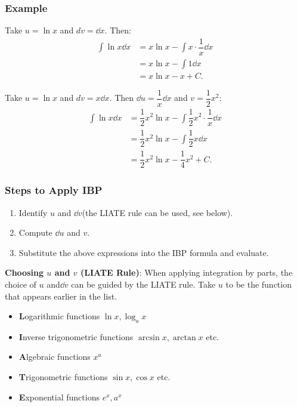 \subsubsection{Example} 
\begin{ex}
    Take $u = \ln x$ and $dv = \dd x$. Then:
    \begin{align*}
        \int \ln x \dd x &= x \ln x - \int x \cdot \dfrac{1}{x} \dd x \\
        &= x \ln x - \int 1 \dd x \\
        &= x \ln x - x + C.
    \end{align*}
\end{ex}

\begin{ex} 
    Take $u = \ln x$ and $dv = x \dd x$. Then $\dd u = \dfrac{1}{x} \dd x $ and $v = \dfrac{1}{2} x^2$:
    \begin{align*}
        \int \ln x \dd x &= \dfrac{1}{2}x^2 \ln x - \int \dfrac{1}{2}x^2 \cdot \dfrac{1}{x} \dd x \\
        &= \dfrac{1}{2}x^2 \ln x - \int \dfrac{1}{2} x \dd x \\
        &= \dfrac{1}{2}x^2 \ln x - \dfrac{1}{4}x^2 + C.
    \end{align*}
\end{ex}


\subsubsection{Steps to Apply IBP}
\begin{enumerate}
    \item Identify $u$ and $\dd v$(the LIATE rule can be used, see below).
    \item Compute $\dd u$ and $v$.
    \item Substitute the above expressions into the IBP formula and evaluate.
\end{enumerate}

\textbf{Choosing $u$ and $v$ (LIATE Rule)}:
When applying integration by parts, the choice of $u$ and$\dd v$ can be guided by the LIATE rule. Take $u$ to be the function that appears earlier in the list.
\begin{itemize}
    \item \textbf{L}ogarithmic functions $\ln x, \log_a x$
    \item \textbf{I}nverse trigonometric functions $\arcsin x, \arctan x$ etc.
    \item \textbf{A}lgebraic functions $x^a$
    \item \textbf{T}rigonometric functions $\sin x, \cos x$ etc.
    \item \textbf{E}xponential functions $e^x, a^x$
\end{itemize}

